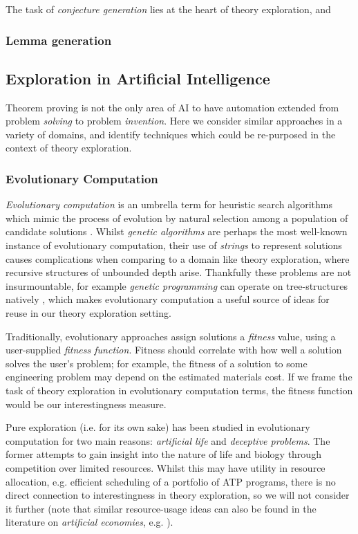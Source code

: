 The task of \emph{conjecture generation} lies at the heart of theory exploration, and

\subsubsection{Lemma generation}

\fi

\subsection{Exploration in Artificial Intelligence}

Theorem proving is not the only area of AI to have automation extended from problem \emph{solving} to problem \emph{invention}. Here we consider similar approaches in a variety of domains, and identify techniques which could be re-purposed in the context of theory exploration.

\subsubsection{Evolutionary Computation}

\emph{Evolutionary computation} is an umbrella term for heuristic search algorithms which mimic the process of evolution by natural selection among a population of candidate solutions \citep{back1997evolutionary}. Whilst \emph{genetic algorithms} are perhaps the most well-known instance of evolutionary computation, their use of \emph{strings} to represent solutions causes complications when comparing to a domain like theory exploration, where recursive structures of unbounded depth arise. Thankfully these problems are not insurmountable, for example \emph{genetic programming} can operate on tree-structures natively \citep{banzhaf1998genetic}, which makes evolutionary computation a useful source of ideas for reuse in our theory exploration setting.

Traditionally, evolutionary approaches assign solutions a \emph{fitness} value, using a user-supplied \emph{fitness function}. Fitness should correlate with how well a solution solves the user's problem; for example, the fitness of a solution to some engineering problem may depend on the estimated materials cost. If we frame the task of theory exploration in evolutionary computation terms, the fitness function would be our interestingness measure.

Pure exploration (i.e. for its own sake) has been studied in evolutionary computation for two main reasons: \emph{artificial life} and \emph{deceptive problems}. The former attempts to gain insight into the nature of life and biology through competition over limited resources. Whilst this may have utility in resource allocation, e.g. efficient scheduling of a portfolio of ATP programs, there is no direct connection to interestingness in theory exploration, so we will not consider it further (note that similar resource-usage ideas can also be found in the literature on \emph{artificial economies}, e.g. \citep{baum2000evolution}).

